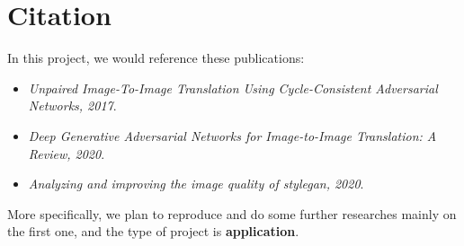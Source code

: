 \section{Citation}

In this project, we would reference these publications:
\begin{itemize}
    \item \textit{Unpaired Image-To-Image Translation Using Cycle-Consistent Adversarial Networks, 2017}\cite{zhu_unpaired_2017}.
    \item \textit{Deep Generative Adversarial Networks for Image-to-Image Translation: A Review, 2020}\cite{sym12101705}.
    \item \textit{Analyzing and improving the image quality of stylegan, 2020}\cite{karras2020analyzing}.
\end{itemize}

More specifically, we plan to reproduce and
do some further researches mainly on the first one,
and the type of project is \textbf{application}.
